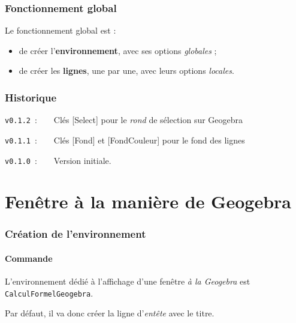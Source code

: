 \documentclass[french,a4paper,11pt]{article}
\begin{document}
\section{Fonctionnement global}

\begin{importantblock}
Le fonctionnement global est :

\begin{itemize}
	\item de créer l'\textbf{environnement}, avec ses options \textit{globales} ;
	\item de créer les \textbf{lignes}, une par une, avec leurs options \textit{locales}.
\end{itemize}
\vspace*{-\baselineskip}\leavevmode
\end{importantblock}

\vfill

\section{Historique}

\verb|v0.1.2|~:~~~~Clés [Select] pour le \textit{rond} de sélection sur Geogebra

\verb|v0.1.1|~:~~~~Clés [Fond] et [FondCouleur] pour le fond des lignes

\verb|v0.1.0|~:~~~~Version initiale.

\hspace*{1cm}

\pagebreak

\part{Fenêtre à la manière de Geogebra}

\section{Création de l'environnement}

\subsection{Commande}

\begin{cautionblock}
L'environnement dédié à l'affichage d'une fenêtre \textit{à la Geogebra} est \texttt{CalculFormelGeogebra}.

Par défaut, il va donc créer la ligne d'\textit{entête} avec le titre.
\end{cautionblock}
\end{document}
